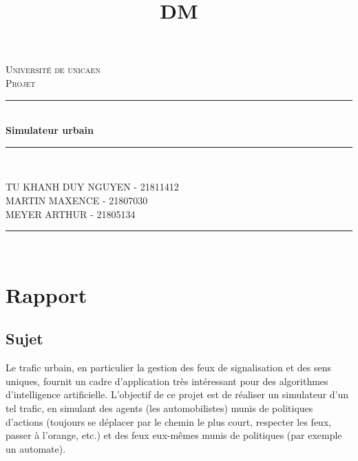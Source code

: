 \documentclass[12pt]{article}
\title{DM}
\newcommand{\HRule}{\rule{\linewidth}{0.5mm}}
\begin{document}
	\begin{titlepage}
  	\begin{sffamily}
  	\begin{center}

    \textsc{\LARGE Université de unicaen}\\[2cm]

    \textsc{\Large Projet}\\[1.5cm]

    \HRule \\[0.4cm]
    { \huge \bfseries Simulateur urbain \\[0.4cm] }
	\HRule \\[7cm]
	
    \begin{minipage}{0.7\textwidth}
      \begin{flushleft} \large
      	TU KHANH DUY NGUYEN - 21811412 \\
        MARTIN  MAXENCE - 21807030\\
        MEYER ARTHUR - 21805134 \\
        
 
      \end{flushleft}
    \end{minipage}
    
    \begin{minipage}{0.4\textwidth}
    \end{minipage}

    \vfill

    \HRule \\[0.4cm]
  \end{center}
  \end{sffamily}
\end{titlepage}

	\newpage

	\tableofcontents

	\newpage
	\section{Rapport}
		\subsection{Sujet}
			Le trafic urbain, en particulier la gestion des feux de signalisation et des sens uniques, fournit un cadre d'application très intéressant pour des algorithmes d'intelligence artificielle. L'objectif de ce projet est de réaliser un simulateur d'un tel trafic, en simulant des agents (les automobilistes) munis de politiques d'actions (toujours se déplacer par le chemin le plus court, respecter les feux, passer à l'orange, etc.) et des feux eux-mêmes munis de politiques (par exemple un automate).
			
\end{document}

